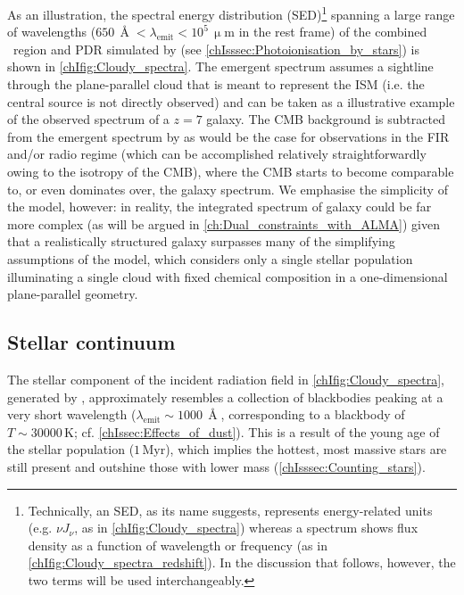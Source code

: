 As an illustration, the spectral energy distribution (SED)\footnote{Technically, an SED, as its name suggests, represents energy-related units (e.g. $\nu J_\nu$, as in \cref{chIfig:Cloudy_spectra}) whereas a spectrum shows flux density as a function of wavelength or frequency (as in \cref{chIfig:Cloudy_spectra_redshift}). In the discussion that follows, however, the two terms will be used interchangeably.} spanning a large range of wavelengths ($650 \, \Angstrom < \lambda_\text{emit} < 10^5 \, \mathrm{\upmu m}$ in the rest frame) of the combined \HII\ region and PDR simulated by  (see \cref{chIsssec:Photoionisation_by_stars}) is shown in \cref{chIfig:Cloudy_spectra}. The emergent spectrum assumes a sightline through the plane-parallel cloud that is meant to represent the ISM (i.e. the central source is not directly observed) and can be taken as a illustrative example of the observed spectrum of a $z = 7$ galaxy. The CMB background is subtracted from the emergent spectrum by  as would be the case for observations in the FIR and/or radio regime (which can be accomplished relatively straightforwardly owing to the isotropy of the CMB), where the CMB starts to become comparable to, or even dominates over, the galaxy spectrum. We emphasise the simplicity of the  model, however: in reality, the integrated spectrum of galaxy could be far more complex (as will be argued in \cref{ch:Dual_constraints_with_ALMA}) given that a realistically structured galaxy surpasses many of the simplifying assumptions of the model, which considers only a single stellar population illuminating a single cloud with fixed chemical composition in a one-dimensional plane-parallel geometry.

\subsection{Stellar continuum}
\label{chIssec:Stellar_continuum}

The stellar component of the incident radiation field in \cref{chIfig:Cloudy_spectra}, generated by , approximately resembles a collection of blackbodies peaking at a very short wavelength ($\lambda_\text{emit} \sim 1000 \, \Angstrom$, corresponding to a blackbody of $T \sim \num{30000} \, \mathrm{K}$; cf. \cref{chIssec:Effects_of_dust}). This is a result of the young age of the stellar population ($1 \, \mathrm{Myr}$), which implies the hottest, most massive stars are still present and outshine those with lower mass (\cref{chIsssec:Counting_stars}).

